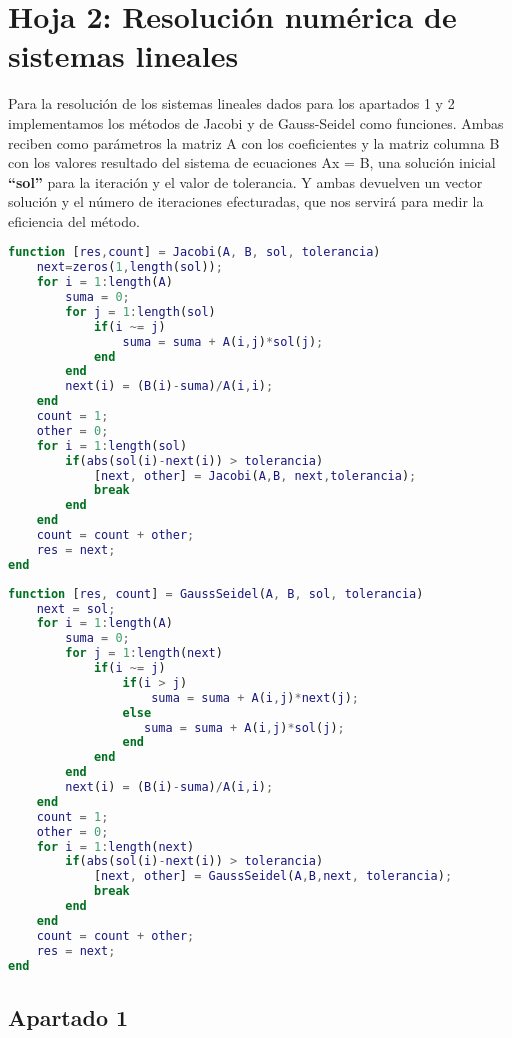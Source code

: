 \section{Hoja 2: Resolución numérica de sistemas lineales}

Para la resolución de los sistemas lineales dados para los apartados 1 y 2 implementamos los métodos de Jacobi y de Gauss-Seidel como funciones. Ambas reciben como parámetros la matriz A con los coeficientes y la matriz columna B con los valores resultado del sistema de ecuaciones Ax = B, una solución inicial \textbf{``sol''} para la iteración y el valor de tolerancia. Y ambas devuelven un vector solución y el número de iteraciones efecturadas, que nos servirá para medir la eficiencia del método.

\begin{lstlisting}[language=Matlab, caption={Método de Jacobi.},captionpos=b,texcl=true]
function [res,count] = Jacobi(A, B, sol, tolerancia)
    next=zeros(1,length(sol));
    for i = 1:length(A)
        suma = 0;
        for j = 1:length(sol)
            if(i ~= j)
                suma = suma + A(i,j)*sol(j);
            end
        end
        next(i) = (B(i)-suma)/A(i,i);
    end
    count = 1;
    other = 0;
    for i = 1:length(sol)
        if(abs(sol(i)-next(i)) > tolerancia)
            [next, other] = Jacobi(A,B, next,tolerancia);
            break
        end
    end
    count = count + other;
    res = next;
end
\end{lstlisting}

\begin{lstlisting}[language=Matlab, caption={Método de Gauss-Seidel.},captionpos=b,texcl=true]
function [res, count] = GaussSeidel(A, B, sol, tolerancia)
    next = sol;
    for i = 1:length(A)
        suma = 0;
        for j = 1:length(next)
            if(i ~= j)
                if(i > j)
                    suma = suma + A(i,j)*next(j);
                else
                   suma = suma + A(i,j)*sol(j);
                end
            end
        end
        next(i) = (B(i)-suma)/A(i,i);
    end
    count = 1;
    other = 0;
    for i = 1:length(next)
        if(abs(sol(i)-next(i)) > tolerancia)
            [next, other] = GaussSeidel(A,B,next, tolerancia);
            break
        end
    end
    count = count + other;
    res = next;
end
\end{lstlisting}

\subsection{Apartado 1}

